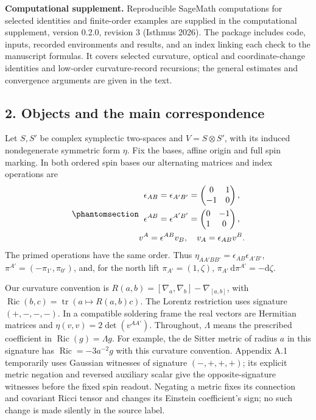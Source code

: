 \documentclass[
  english,
  11pt,
  reqno]{amsart}
\begin{document}
\textbf{Computational supplement.} Reproducible SageMath computations
for selected identities and finite-order examples are supplied in the
computational supplement, version 0.2.0, revision 3 (Isthmus 2026). The
package includes code, inputs, recorded environments and results, and an
index linking each check to the manuscript formulas. It covers selected
curvature, optical and coordinate-change identities and low-order
curvature-record recursions; the general estimates and convergence
arguments are given in the text.

\protect{}\label{sec:gg-objects}

\subsection{2. Objects and the main
correspondence}\label{objects-and-the-main-correspondence}

Let \(S,S'\) be complex symplectic two-spaces and \(V=S\otimes S'\),
with its induced nondegenerate symmetric form \(\eta\). Fix the bases,
affine origin and full spin marking. In both ordered spin bases our
alternating matrices and index operations are
\begin{equation}\protect\phantomsection\label{eq:gg-spin-index-convention}{\begin{gathered}
\epsilon_{AB}=\epsilon_{A'B'}=
       \begin{pmatrix}0&1\\-1&0\end{pmatrix}, \\
\epsilon^{AB}=\epsilon^{A'B'}=
       \begin{pmatrix}0&-1\\1&0\end{pmatrix}, \\
v^A=\epsilon^{AB}v_B,\quad v_A=\epsilon_{AB}v^B .
\end{gathered}}\end{equation} The primed operations have the same order. Thus
\(\eta_{AA'BB'}=\epsilon_{AB}\epsilon_{A'B'}\),
\(\pi^{A'}=(-\pi_{1'},\pi_{0'})\), and, for the north lift
\(\pi_{A'}=(1,\zeta)\), \(\pi_{A'}\,\mathrm d\pi^{A'}=-\mathrm d\zeta\).

\protect{}\label{sec:gg-curvature-signature-conventions}

Our curvature convention is
\(R(a,b)=[\nabla_a,\nabla_b]-\nabla_{[a,b]}\), with
\(\operatorname{Ric}(b,c)=\operatorname{tr}(a\mapsto R(a,b)c)\). The
Lorentz restriction uses signature \((+,-,-,-)\). In a compatible
soldering frame the real vectors are Hermitian matrices and
\(\eta(v,v)=2\det(v^{AA'})\). Throughout, \(\Lambda\) means the
prescribed coefficient in \(\operatorname{Ric}(g)=\Lambda g\). For
example, the de Sitter metric of radius \(a\) in this signature has
\(\operatorname{Ric}=-3a^{-2}g\) with this curvature convention.
Appendix A.1 temporarily uses Gaussian witnesses of signature
\((-,+,+,+)\); its explicit metric negation and reversed auxiliary
scalar give the opposite-signature witnesses before the fixed spin
readout. Negating a metric fixes its connection and covariant Ricci
tensor and changes its Einstein coefficient's sign; no such change is
made silently in the source label.
\end{document}
